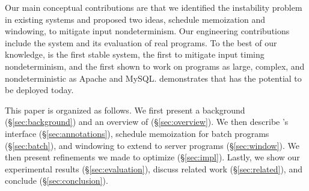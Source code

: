 Our main conceptual contributions are that we identified the instability
problem in existing \dmt systems and proposed two ideas, schedule
memoization and windowing, to mitigate input nondeterminism.  Our
engineering contributions include the \tern system and its evaluation of
real programs.  To the best of our knowledge, \tern is the first stable
\dmt system, the first to mitigate input timing nondeterminism, and the
first shown to work on programs as large, complex, and nondeterministic as
Apache and MySQL.  \tern demonstrates that \dmt has the potential to be
deployed today.

This paper is organized as follows.  We first present a background
(\S\ref{sec:background}) and an overview of \tern (\S\ref{sec:overview}).
We then describe \tern's interface (\S\ref{sec:annotations}), schedule
memoization for batch programs (\S\ref{sec:batch}), and windowing to
extend \tern to server programs (\S\ref{sec:window}).  We then present 
refinements we made to optimize \tern (\S\ref{sec:impl}).  Lastly, we show
our experimental results (\S\ref{sec:evaluation}), discuss related work
(\S\ref{sec:related}), and conclude (\S\ref{sec:conclusion}).
